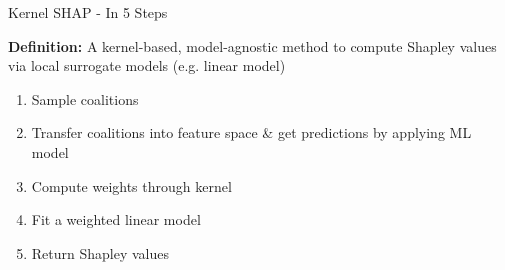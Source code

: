 \documentclass[11pt,compress,t,notes=noshow, aspectratio=169, xcolor=table]{beamer}
\begin{document}

\begin{frame}{Kernel SHAP - In 5 Steps}

\textbf{Definition:} A kernel-based, model-agnostic method to compute Shapley values via local surrogate models (e.g. linear model)\\
\vspace{1cm}
\begin{enumerate}
    \item Sample coalitions 
    
    \item Transfer coalitions into feature space \& get predictions by applying ML model
    
    
    \item Compute weights through kernel
    
    \item Fit a weighted linear model 

    \item Return Shapley values
    
    
\end{enumerate}

\end{frame}
\end{document}
